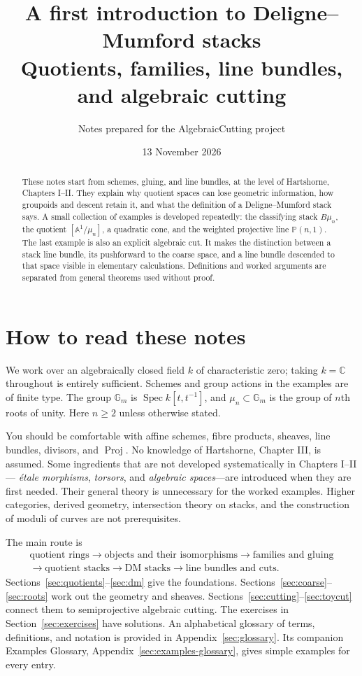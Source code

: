 \documentclass[11pt,a4paper]{article}
\title{A first introduction to Deligne--Mumford stacks\\[5pt]
\large Quotients, families, line bundles, and algebraic cutting}
\author{Notes prepared for the AlgebraicCutting project}
\date{13 November 2026}
\numberwithin{equation}{section}
\theoremstyle{definition}
\newcommand{\A}{\mathbb A}
\newcommand{\PP}{\mathbb P}
\newcommand{\Gm}{\mathbb G_m}
\newcommand{\Spec}{\operatorname{Spec}}
\newcommand{\Proj}{\operatorname{Proj}}
\begin{document}
\maketitle
\begin{abstract}
These notes start from schemes, gluing, and line bundles, at the level of
Hartshorne, Chapters I--II. They explain why quotient spaces can lose geometric
information, how groupoids and descent retain it, and what the definition of a
Deligne--Mumford stack says. A small collection of examples is developed repeatedly:
the classifying stack $B\mu_n$, the quotient $[\A^1/\mu_n]$, a quadratic cone,
and the weighted projective line $\PP(n,1)$. The last example is also an explicit
algebraic cut. It makes the distinction between a stack line bundle, its
pushforward to the coarse space, and a line bundle descended to that space visible
in elementary calculations. Definitions and worked arguments are separated from
general theorems used without proof.
\end{abstract}
\tableofcontents
\newpage

\section{How to read these notes}
\label{sec:reading}

We work over an algebraically closed field $k$ of characteristic zero; taking
$k=\mathbb C$ throughout is entirely sufficient. Schemes and group actions in the
examples are of finite type. The group $\Gm$ is $\Spec k[t,t^{-1}]$, and
$\mu_n\subset\Gm$ is the group of $n$th roots of unity. Here $n\geq2$ unless
otherwise stated.

You should be comfortable with affine schemes, fibre products, sheaves, line
bundles, divisors, and $\Proj$. No knowledge of Hartshorne, Chapter III, is assumed.
Some ingredients that are not developed systematically in Chapters I--II---
\emph{étale morphisms}, \emph{torsors}, and \emph{algebraic spaces}---are introduced
when they are first needed. Their general theory is unnecessary for the worked
examples. Higher categories, derived geometry, intersection theory on stacks, and
the construction of moduli of curves are not prerequisites.

The main route is
\[
\begin{gathered}
\text{quotient rings}\longrightarrow\text{objects and their isomorphisms}
\longrightarrow\text{families and gluing}\\
\longrightarrow\text{quotient stacks}\longrightarrow\text{DM stacks}
\longrightarrow\text{line bundles and cuts}.
\end{gathered}
\]
Sections~\ref{sec:quotients}--\ref{sec:dm} give the foundations.
Sections~\ref{sec:coarse}--\ref{sec:roots} work out the geometry and sheaves.
Sections~\ref{sec:cutting}--\ref{sec:toycut} connect them to semiprojective
algebraic cutting. The exercises in Section~\ref{sec:exercises} have solutions.
An alphabetical glossary of terms, definitions, and notation is provided
in Appendix~\ref{sec:glossary}. Its companion Examples Glossary,
Appendix~\ref{sec:examples-glossary}, gives simple examples for every entry.
\end{document}
